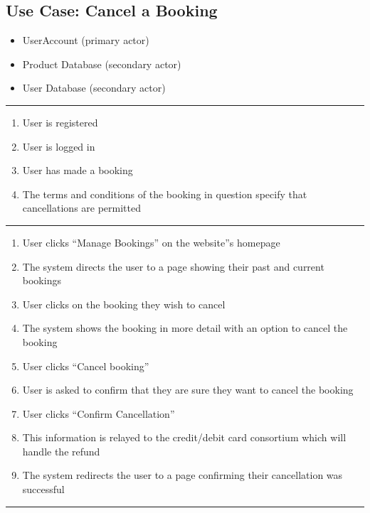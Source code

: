 \vspace{4ex}
\hspace{-4.2cm}
\begin{minipage}[h][][s]{\linewidth}
	\subsection{Use Case: Cancel a Booking}
\end{minipage}

\begin{itemize}
	\item UserAccount (primary actor)
	\item Product Database (secondary actor)
	\item User Database (secondary actor)
\end{itemize}
\noindent\rule{\textwidth}{0.6pt}

\begin{enumerate}
	\item User is registered
	\item User is logged in
	\item User has made a booking
	\item The terms and conditions of the booking in question specify that
		cancellations are permitted
\end{enumerate}
\noindent\rule{\textwidth}{0.6pt}

\begin{enumerate}
	\item User clicks ``Manage Bookings'' on the website''s homepage
	\item The system directs the user to a page showing their past and current
		bookings
	\item User clicks on the booking they wish to cancel
	\item The system shows the booking in more detail with an option to cancel
		the booking
	\item User clicks ``Cancel booking''
	\item User is asked to confirm that they are sure they want to cancel the
		booking
	\item User clicks ``Confirm Cancellation''
	\item This information is relayed to the credit/debit card consortium which
		will handle the refund
	\item The system redirects the user to a page confirming their cancellation
		was successful
\end{enumerate}
\noindent\rule{\textwidth}{0.6pt}

